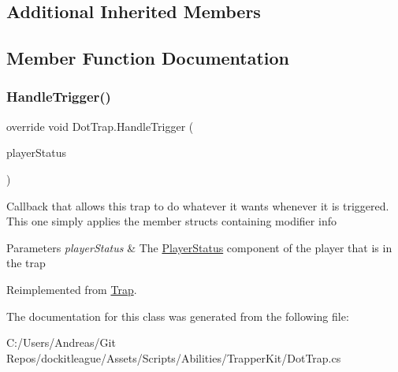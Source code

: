 \subsection*{Additional Inherited Members}


\subsection{Member Function Documentation}
\hypertarget{class_dot_trap_a40e21aaaf98d98cbf006a4c70d5d3809}{}\label{class_dot_trap_a40e21aaaf98d98cbf006a4c70d5d3809} 
\subsubsection{\texorpdfstring{Handle\+Trigger()}{HandleTrigger()}}
{\footnotesize\ttfamily override void Dot\+Trap.\+Handle\+Trigger (\begin{DoxyParamCaption}\item[{\hyperlink{class_player_status}{Player\+Status}}]{player\+Status }\end{DoxyParamCaption})\hspace{0.3cm}{\ttfamily [virtual]}}



Callback that allows this trap to do whatever it wants whenever it is triggered. This one simply applies the member structs containing modifier info 


\begin{DoxyParams}{Parameters}
{\em player\+Status} & The \hyperlink{class_player_status}{Player\+Status} component of the player that is in the trap\\
\hline
\end{DoxyParams}


Reimplemented from \hyperlink{class_trap_a2e92a6f420a5d21a132108d8dd3ca5de}{Trap}.



The documentation for this class was generated from the following file\+:\begin{DoxyCompactItemize}
\item 
C\+:/\+Users/\+Andreas/\+Git Repos/dockitleague/\+Assets/\+Scripts/\+Abilities/\+Trapper\+Kit/Dot\+Trap.\+cs\end{DoxyCompactItemize}
